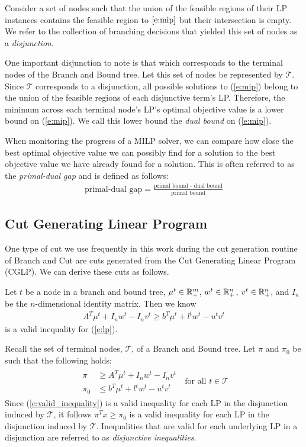 \documentclass[10pt]{article}
\begin{document}
	Consider a set of nodes such that the union of the feasible regions of their LP instances contains the feasible region to $ \ref{e:mip} $ but their intersection is empty. We refer to the collection of branching decisions that yielded this set of nodes as a \textit{disjunction}.
	
	One important disjunction to note is that which corresponds to the terminal nodes of the Branch and Bound tree. Let this set of nodes be represented by $ \mathcal{T} $. Since $ \mathcal{T} $ corresponds to a disjunction, all possible solutions to (\ref{e:mip}) belong to the union of the feasible regions of each disjunctive term's LP. Therefore, the minimum across each terminal node's LP's optimal objective value is a lower bound on (\ref{e:mip}). We call this lower bound the \textit{dual bound} on (\ref{e:mip}).
	
	When monitoring the progress of a MILP solver, we can compare how close the best optimal objective value we can possibly find for a solution to the best objective value we have already found for a solution. This is often referred to as the \textit{primal-dual gap} and is defined as follows:
	\begin{align}
		\text{primal-dual gap} = \frac{\text{primal bound - dual bound}}{\text{primal bound}} \label{e:mip_gap}
	\end{align}
	
	\subsection{Cut Generating Linear Program} \label{ss:cglp}
	One type of cut we use frequently in this work during the cut generation routine of Branch and Cut are cuts generated from the Cut Generating Linear Program (CGLP). We can derive these cuts as follows.
	
	Let $ t $ be a node in a branch and bound tree, $ \mu^t \in \mathbb{R}_+^m $, $ w^t \in \mathbb{R}_+^n $, $ v^t \in \mathbb{R}_+^n $, and $ I_n $ be the $ n $-dimensional identity matrix. Then we know
	\begin{align}
		A^T \mu^t + I_n w^t - I_n v^t \geq b^T \mu^t + l^t w^t - u^t v^t \label{e:valid_inequality}
	\end{align}
	is a valid inequality for (\ref{e:lp}).
	
	Recall the set of terminal nodes, $ \mathcal{T} $, of a Branch and Bound tree. Let $ \pi $ and $ \pi_0 $ be such that the following holds:
	\begin{align}
		\begin{split}
			\pi &\geq A^T \mu^t + I_n w^t - I_n v^t \\
			\pi_0 & \leq b^T \mu^t + l^t w^t - u^t v^t
		\end{split} \; \text{ for all } t \in \mathcal{T} \label{e:disjunctive_inequality}
	\end{align}
	Since (\ref{e:valid_inequality}) is a valid inequality for each LP in the disjunction induced by $ \mathcal{T} $, it follows $ \pi^T x \geq \pi_0 $ is a valid inequality for each LP in the disjunction induced by $ \mathcal{T} $. Inequalities that are valid for each underlying LP in a disjunction are referred to as \textit{disjunctive inequalities}.
	
\end{document}
